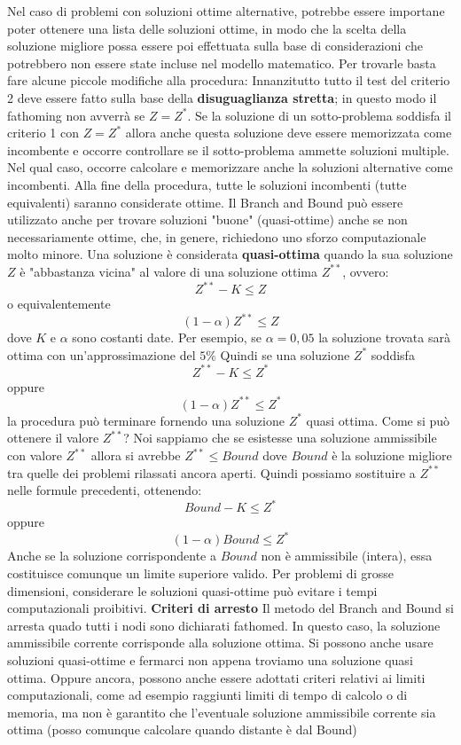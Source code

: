 \documentclass[12pt]{article}
\begin{document}
Nel caso di problemi con soluzioni ottime alternative, potrebbe essere importane poter ottenere una lista delle soluzioni ottime, in modo che la scelta della soluzione migliore possa essere poi effettuata sulla base di considerazioni
che potrebbero non essere state incluse nel modello matematico. Per trovarle basta fare alcune piccole modifiche alla procedura: \newline
Innanzitutto tutto il test del criterio 2 deve essere fatto sulla base della \textbf{disuguaglianza stretta}; in questo modo il fathoming non avverrà se $Z = Z^*$.
Se la soluzione di un sotto-problema soddisfa il criterio 1 con $Z = Z^*$ allora anche questa soluzione deve essere memorizzata come incombente e occorre controllare se il sotto-problema ammette soluzioni
multiple. Nel qual caso, occorre calcolare e memorizzare anche la soluzioni alternative come incombenti.
Alla fine della procedura, tutte le soluzioni incombenti (tutte equivalenti) saranno considerate ottime. \newline
Il Branch and Bound può essere utilizzato anche per trovare soluzioni "buone" (quasi-ottime) anche se non necessariamente ottime, che, in genere,
richiedono uno sforzo computazionale molto minore. Una soluzione è considerata \textbf{quasi-ottima} quando la sua soluzione $Z$ è "abbastanza vicina" al valore di una soluzione
ottima $Z^{**}$, ovvero:
$$Z^{**} - K \leq Z$$
o equivalentemente
$$(1-\alpha)Z^{**} \leq Z$$
dove $K$ e $\alpha$ sono costanti date.
Per esempio, se $\alpha = 0,05$ la soluzione trovata sarà ottima con un'approssimazione del $5\%$
Quindi se una soluzione $Z^*$ soddisfa
$$Z^{**} - K \leq Z^*$$
oppure
$$(1-\alpha)Z^{**} \leq Z^*$$
la procedura può terminare fornendo una soluzione $Z^*$ quasi ottima. \newline
Come si può ottenere il valore $Z^{**}$?
Noi sappiamo che se esistesse una soluzione ammissibile con valore $Z^{**}$ allora si avrebbe $Z^{**} \leq Bound$
dove $Bound$ è la soluzione migliore tra quelle dei problemi rilassati ancora aperti.
Quindi possiamo sostituire a $Z^{**}$ nelle formule precedenti, ottenendo:
$$Bound - K \leq Z^{*}$$
oppure
$$(1- \alpha)Bound \leq Z^*$$
Anche se la soluzione corrispondente a $Bound$ non è ammissibile (intera), essa costituisce comunque  un limite superiore valido.
Per problemi di grosse dimensioni, considerare le soluzioni quasi-ottime può evitare i tempi computazionali proibitivi. \newline
\textbf{Criteri di arresto} \newline
Il metodo del Branch and Bound si arresta quado tutti i nodi sono dichiarati fathomed.
In questo caso, la soluzione ammissibile corrente corrisponde alla soluzione ottima.
Si possono anche usare soluzioni quasi-ottime e fermarci non appena troviamo una soluzione quasi ottima.
Oppure ancora, possono anche essere adottati criteri relativi ai limiti computazionali, come ad esempio raggiunti limiti di tempo
di calcolo o di memoria, ma non è garantito che l'eventuale soluzione ammissibile corrente sia ottima (posso comunque calcolare quando distante è dal Bound)
\end{document}
